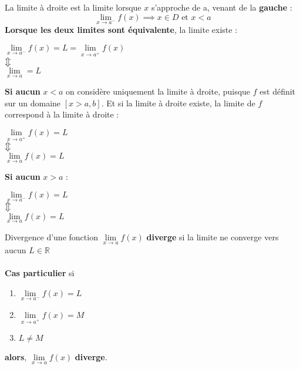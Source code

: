 \documentclass{report}
\newcommand{\varitem}[3][black]{%
    \item[%
        \colorbox{#2}{\textcolor{#1}{\makebox(5.5,7){#3}}}%
    ]
}
\begin{document}
\begin{multicols*}{3}
\begin{Definitionx*}{}{}
    \textcolor{myb}{La limite à droite} est la limite lorsque $x$ s'approche de a, venant de la \textbf{gauche} : \\ 
    \[ \lim\limits_{x\to a^{-}} f(x) \implies  x \in D \text{ et } x < a \]   
  \textbf{Lorsque les deux limites sont équivalente}, \textcolor{myb}{la limite existe } :   
  
  \begin{center}
    $\lim\limits_{x\to a^{-}}f(x) = L = \lim\limits_{x\to a^{+}}f(x) $\\ 
    $\big\Updownarrow$ \\
    $\lim\limits_{x\to a} = L$
  \end{center}

  \textbf{Si aucun} $x < a$ on considère uniquement la limite à droite, 
  puisque $f$ est définit sur un domaine $[x > a, b]$. Et si la limite 
  à droite existe, la limite de $f$ correspond à la limite à droite : 
  
  \begin{center}
    $\lim\limits_{x\to a^{+}}f(x) = L $ \\ 
    $\big\Updownarrow$ \\
    $\lim\limits_{x\to a}f(x) = L $
  \end{center}

  \textbf{Si aucun} $x > a$ :  
  
  \begin{center}
    $\lim\limits_{x\to a^{-}}f(x) = L $ \\ 
    $\big\Updownarrow$ \\
    $\lim\limits_{x\to a}f(x) = L $
  \end{center}

\end{Definitionx*}

\begin{Definitionx*}{Divergence d'une fonction}{}
  $\lim\limits_{x\to a}f(x) $ \textbf{diverge}   si la limite ne converge vers aucun $L \in \mathbb{R}$
  \\
  \\
  \textcolor{myb}{\textbf{Cas particulier}} si 
  {\begin{enumerate}
      \varitem{blue!40}{\textbf{1}} $\lim\limits_{x\to a^{-}}f(x) = L $
      \varitem{blue!40}{\textbf{2}} $\lim\limits_{x\to a^{+}}f(x) = M $ 
      \varitem{blue!40}{\textbf{3}} $ L \neq M$ 
  \end{enumerate}}
  \begin{center}
      \textbf{alors}, $\lim\limits_{x\to a}f(x) $ \textcolor{myr}{\textbf{diverge}}. 
  \end{center}
\end{Definitionx*}
\columnbreak



\end{multicols*}
\end{document}
